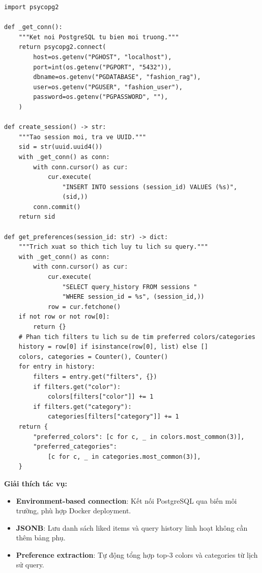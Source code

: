 \documentclass[12pt,a4paper]{report}
\begin{document}
\begin{lstlisting}[caption={PostgreSQL Data Access Layer --- agent/memory.py}]
import psycopg2

def _get_conn():
    """Ket noi PostgreSQL tu bien moi truong."""
    return psycopg2.connect(
        host=os.getenv("PGHOST", "localhost"),
        port=int(os.getenv("PGPORT", "5432")),
        dbname=os.getenv("PGDATABASE", "fashion_rag"),
        user=os.getenv("PGUSER", "fashion_user"),
        password=os.getenv("PGPASSWORD", ""),
    )

def create_session() -> str:
    """Tao session moi, tra ve UUID."""
    sid = str(uuid.uuid4())
    with _get_conn() as conn:
        with conn.cursor() as cur:
            cur.execute(
                "INSERT INTO sessions (session_id) VALUES (%s)",
                (sid,))
        conn.commit()
    return sid

def get_preferences(session_id: str) -> dict:
    """Trich xuat so thich tich luy tu lich su query."""
    with _get_conn() as conn:
        with conn.cursor() as cur:
            cur.execute(
                "SELECT query_history FROM sessions "
                "WHERE session_id = %s", (session_id,))
            row = cur.fetchone()
    if not row or not row[0]:
        return {}
    # Phan tich filters tu lich su de tim preferred colors/categories
    history = row[0] if isinstance(row[0], list) else []
    colors, categories = Counter(), Counter()
    for entry in history:
        filters = entry.get("filters", {})
        if filters.get("color"):
            colors[filters["color"]] += 1
        if filters.get("category"):
            categories[filters["category"]] += 1
    return {
        "preferred_colors": [c for c, _ in colors.most_common(3)],
        "preferred_categories":
            [c for c, _ in categories.most_common(3)],
    }
\end{lstlisting}

\textbf{Giải thích tác vụ:}
\begin{itemize}
    \item \textbf{Environment-based connection}: Kết nối PostgreSQL qua biến môi trường, phù hợp Docker deployment.
    \item \textbf{JSONB}: Lưu danh sách liked items và query history linh hoạt không cần thêm bảng phụ.
    \item \textbf{Preference extraction}: Tự động tổng hợp top-3 colors và categories từ lịch sử query.
\end{itemize}

\end{document}
